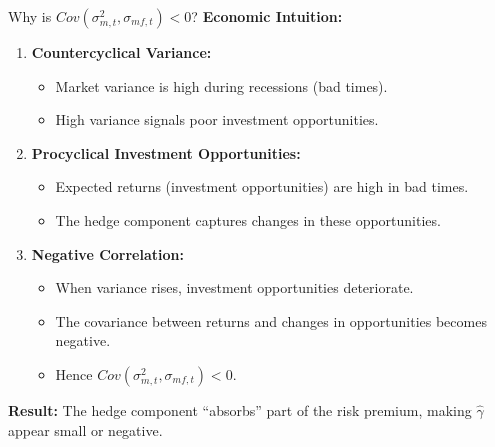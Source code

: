 \documentclass{beamer}
\begin{document}
\begin{frame}{Why is $Cov(\sigma_{m,t}^2, \sigma_{mf,t}) < 0$?}
    \textbf{Economic Intuition:}
    
    \begin{enumerate}
        \item \textbf{Countercyclical Variance:}
            \begin{itemize}
                \item Market variance is high during recessions (bad times).
                \item High variance signals poor investment opportunities.
            \end{itemize}
        
        \item \textbf{Procyclical Investment Opportunities:}
            \begin{itemize}
                \item Expected returns (investment opportunities) are high in bad times.
                \item The hedge component captures changes in these opportunities.
            \end{itemize}
        
        \item \textbf{Negative Correlation:}
            \begin{itemize}
                \item When variance rises, investment opportunities deteriorate.
                \item The covariance between returns and changes in opportunities becomes negative.
                \item Hence $Cov(\sigma_{m,t}^2, \sigma_{mf,t}) < 0$.
            \end{itemize}
    \end{enumerate}
    
    \textbf{Result:} The hedge component ``absorbs'' part of the risk premium, making $\hat{\gamma}$ appear small or negative.
\end{frame}
\end{document}
